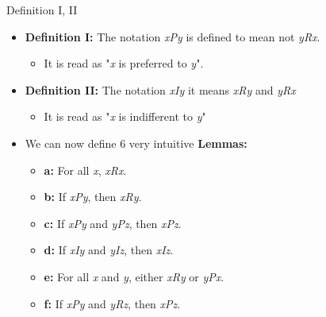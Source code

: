 \documentclass{beamer}
\begin{document}
\begin{frame}{Definition I, II}
    \begin{itemize}
        \item \textbf{Definition I:} The notation \textit{xPy} is defined to mean not \textit{yRx}. 
        \begin{itemize}
            \item It is read as "\textit{x} is preferred to \textit{y}".
        \end{itemize}
        \vspace{0.5 cm}
        \item \textbf{Definition II:} The notation \textit{xIy} it means \textit{xRy} and \textit{yRx} 
        \begin{itemize}
            \item It is read as "\textit{x} is indifferent to \textit{y}"
        \end{itemize}
        \vspace{0.5 cm}
         \item We can now define 6 very intuitive \textbf{Lemmas:}
            \begin{itemize}
                \item \textbf{a:} For all \textit{x}, \textit{xRx}.
                \item \textbf{b:} If \textit{xPy}, then \textit{xRy}.
                \item \textbf{c:} If \textit{xPy} and \textit{yPz}, then \textit{xPz}.
                \item \textbf{d:} If \textit{xIy} and \textit{yIz}, then \textit{xIz}.
                \item \textbf{e:} For all \textit{x} and \textit{y}, either \textit{xRy} or \textit{yPx}.
                \item \textbf{f:} If \textit{xPy} and \textit{yRz}, then \textit{xPz}.
            \end{itemize}
        \end{itemize}

    
\end{frame}
\end{document}
